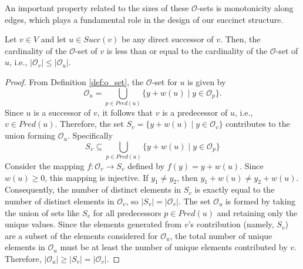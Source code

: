 An important property related to the sizes of these $\mathcal{O}$-sets is monotonicity along edges, which plays a fundamental role in the design of our succinct structure.

\begin{lemma}
    \label{lem:o_set_cardinality_monotonicity}
    Let $v \in V$ and let $u \in Succ(v)$ be any direct successor of $v$. Then, the cardinality of the $\mathcal{O}$-set of $v$ is less than or equal to the cardinality of the $\mathcal{O}$-set of $u$, i.e., $|\mathcal{O}_v| \le |\mathcal{O}_u|$.
\end{lemma}
\begin{proof}
    From Definition \ref{def:o_set}, the $\mathcal{O}$-set for $u$ is given by
    \[ \mathcal{O}_u = \bigcup_{p \in Pred(u)} \{ y + w(u) \mid y \in \mathcal{O}_p \}. \]
    Since $u$ is a successor of $v$, it follows that $v$ is a predecessor of $u$, i.e., $v \in Pred(u)$. Therefore, the set $S_v = \{ y + w(u) \mid y \in \mathcal{O}_v \}$ contributes to the union forming $\mathcal{O}_u$. Specifically
    \[S_v \subseteq \bigcup_{p \in Pred(u)} \{ y + w(u) \mid y \in \mathcal{O}_p \}\]
    Consider the mapping $f: \mathcal{O}_v \to S_v$ defined by $f(y) = y + w(u)$. Since $w(u) \ge 0$, this mapping is injective. If $y_1 \neq y_2$, then $y_1 + w(u) \neq y_2 + w(u)$. Consequently, the number of distinct elements in $S_v$ is exactly equal to the number of distinct elements in $\mathcal{O}_v$, so $|S_v| = |\mathcal{O}_v|$.
    The set $\mathcal{O}_u$ is formed by taking the union of sets like $S_v$ for all predecessors $p \in Pred(u)$ and retaining only the unique values. Since the elements generated from $v$'s contribution (namely, $S_v$) are a subset of the elements considered for $\mathcal{O}_u$, the total number of unique elements in $\mathcal{O}_u$ must be at least the number of unique elements contributed by $v$.
    Therefore, $|\mathcal{O}_u| \ge |S_v| = |\mathcal{O}_v|$.
\end{proof}

